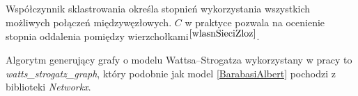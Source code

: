 \documentclass[a4paper, 12pt, twoside, openright]{article}
\begin{document}
	Współczynnik sklastrowania określa stopnień wykorzystania wszystkich możliwych połączeń międzywęzłowych. $C$ w praktyce pozwala na ocenienie stopnia oddalenia pomiędzy wierzchołkami$^{\cite{wlasnSieciZloz}}$.
	
	 Algorytm generujący grafy o modelu Wattsa–Strogatza wykorzystany w pracy to \textit{watts\_strogatz\_graph}, który podobnie jak model \ref{BarabasiAlbert} pochodzi z biblioteki \textit{Networkx}.

\captionsetup{justification=centering}
\begin{figure}[!p]
	\centering
	\quad
	\quad
	\quad
	\quad

\end{figure}
\end{document}
